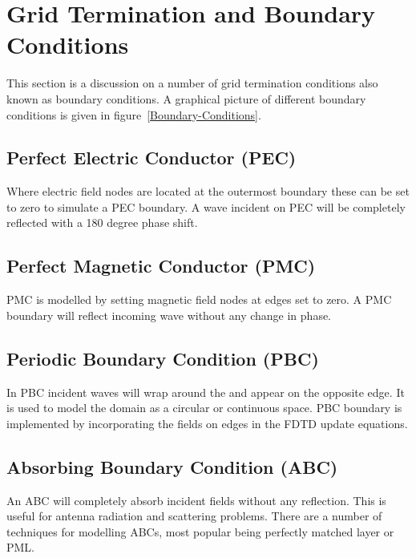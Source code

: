 \documentclass[10pt,A4paper]{report}
\begin{document}
\section{Grid Termination and Boundary Conditions}
This section is a discussion on a number of grid termination conditions also known as boundary conditions. A graphical picture of different boundary conditions is given in figure~\ref{Boundary-Conditions}.
\subsection{Perfect Electric Conductor (PEC)}
Where electric field nodes are located at the outermost boundary these can be set to zero to simulate a PEC boundary. A wave incident on PEC will be completely reflected with a 180 degree phase shift.
\subsection{Perfect Magnetic Conductor (PMC)}
PMC is modelled by setting magnetic field nodes at edges set to zero. A PMC boundary will reflect incoming wave without any change in phase.
\subsection{Periodic Boundary Condition (PBC)}
In PBC incident waves will wrap around the and appear on the opposite edge. It is used to model the domain as a circular or continuous space. PBC boundary is implemented by incorporating the fields on edges in the FDTD update equations.
\subsection{Absorbing Boundary Condition (ABC)}
An ABC will completely absorb incident fields without any reflection. This is useful for antenna radiation and scattering problems. There are a number of techniques for modelling ABCs, most popular being perfectly matched layer or PML.
\end{document}
